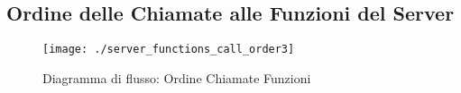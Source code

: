 \newpage
{}
\subsection{Ordine delle Chiamate alle Funzioni del Server}

\begin{figure}[ht] %
	\centering
	\texttt{[image: ./server\_functions\_call\_order3]}
	\caption{Diagramma di flusso: Ordine Chiamate Funzioni}
	\label{fig:server_functions_call_order}
\end{figure}

\restoregeometry

\newpage


